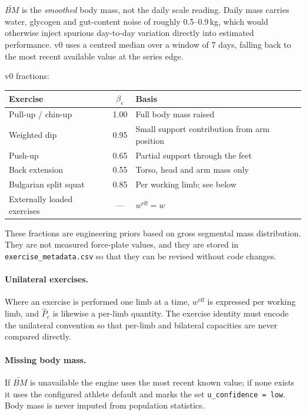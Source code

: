 \documentclass[11pt]{article}
\begin{document}
$\widetilde{BM}$ is the \emph{smoothed} body mass, not the daily scale reading. Daily mass carries water, glycogen and gut-content noise of roughly 0.5--0.9\,kg, which would otherwise inject spurious day-to-day variation directly into estimated performance. v0 uses a centred median over a window of $7$ days, falling back to the most recent available value at the series edge.

v0 fractions:

\begin{center}
\begin{tabular}{lcl}
\toprule
Exercise & $\beta_e$ & Basis \\
\midrule
Pull-up / chin-up & 1.00 & Full body mass raised \\
Weighted dip & 0.95 & Small support contribution from arm position \\
Push-up & 0.65 & Partial support through the feet \\
Back extension & 0.55 & Torso, head and arm mass only \\
Bulgarian split squat & 0.85 & Per working limb; see below \\
Externally loaded exercises & --- & $w^{\mathrm{eff}}=w$ \\
\bottomrule
\end{tabular}
\end{center}

These fractions are engineering priors based on gross segmental mass distribution. They are not measured force-plate values, and they are stored in \texttt{exercise\_metadata.csv} so that they can be revised without code changes.

\paragraph{Unilateral exercises.} Where an exercise is performed one limb at a time, $w^{\mathrm{eff}}$ is expressed per working limb, and $\widehat P_e$ is likewise a per-limb quantity. The exercise identity must encode the unilateral convention so that per-limb and bilateral capacities are never compared directly.

\paragraph{Missing body mass.} If $\widetilde{BM}$ is unavailable the engine uses the most recent known value; if none exists it uses the configured athlete default and marks the set \texttt{u\_confidence = low}. Body mass is never imputed from population statistics.
\end{document}
